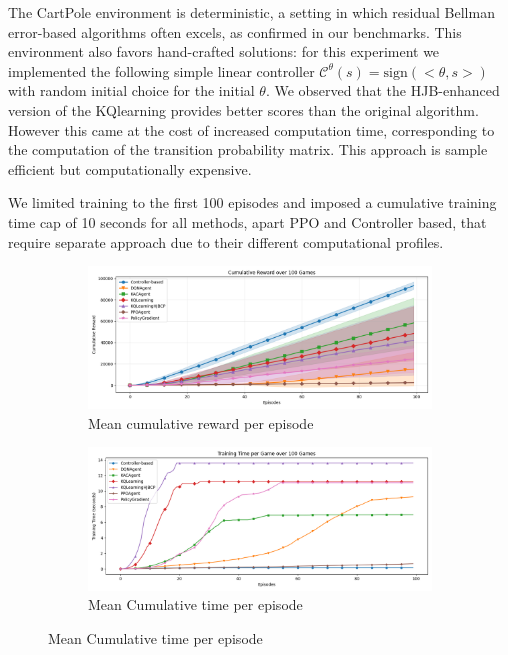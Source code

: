 \documentclass[
]{article}
\numberwithin{equation}{section}
\begin{document}
The CartPole environment is deterministic, a setting in which residual Bellman error-based algorithms often excels, as confirmed in our benchmarks. This environment also favors hand-crafted solutions: for this experiment we implemented the following simple linear controller $\mathcal{C}^{\theta}(s) = \text{sign}(<\theta , s>)$ with random initial choice for the initial $\theta$. We observed that the HJB-enhanced version of the KQlearning provides better scores than the original algorithm. However this came at the cost of increased computation time, corresponding to the computation of the transition probability matrix. This approach is sample efficient but computationally expensive.

We limited training to the first 100 episodes and imposed a cumulative training time cap of 10 seconds for all methods, apart PPO and Controller based, that require separate approach due to their different computational profiles.

\begin{figure}[!htb]
    \centering
    \begin{subfigure}{0.48\textwidth}
        \centering
        \includegraphics[width=\textwidth]{figs/plot_rewards_CP.png}
        \caption{Mean cumulative reward per episode}
        \label{fig:image1}
    \end{subfigure}
    \hfill
    \begin{subfigure}{0.48\textwidth}
        \centering
        \includegraphics[width=\textwidth]{figs/plot_times_CP.png}
        \caption{Mean Cumulative time per episode}
        \label{fig:image2}
    \end{subfigure}
\end{figure}
\end{document}
